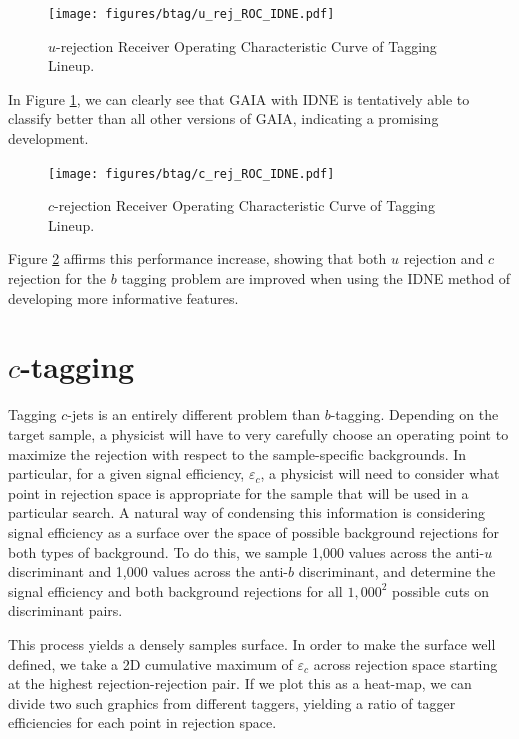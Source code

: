 \begin{figure}
\texttt{[image: figures/btag/u\_rej\_ROC\_IDNE.pdf]}
\caption[The ATLAS detector]{$u$-rejection Receiver Operating Characteristic Curve of Tagging Lineup.
\label{fig:urejROCIDNE}}
\end{figure}

In Figure \ref{fig:urejROCIDNE}, we can clearly see that GAIA with IDNE is tentatively able to classify better than all other versions of GAIA, indicating a promising development.  

\begin{figure}
\texttt{[image: figures/btag/c\_rej\_ROC\_IDNE.pdf]}
\caption[The ATLAS detector]{$c$-rejection Receiver Operating Characteristic Curve of Tagging Lineup.
\label{fig:crejROCIDNE}}
\end{figure}
Figure \ref{fig:crejROCIDNE} affirms this performance increase, showing that both $u$ rejection and $c$ rejection for the $b$ tagging problem are improved when using the IDNE method of developing more informative features. 

\section{$c$-tagging}

Tagging $c$-jets is an entirely different problem than $b$-tagging. Depending on the target sample, a physicist will have to very carefully choose an operating point to maximize the rejection with respect to the sample-specific backgrounds. In particular, for a given signal efficiency, $\varepsilon_c$, a physicist will need to consider what point in rejection space is appropriate for the sample that will be used in a particular search. A natural way of condensing this information is considering signal efficiency as a surface over the space of possible background rejections for both types of background. To do this, we sample 1,000 values across the anti-$u$ discriminant and 1,000 values across the anti-$b$ discriminant, and determine the signal efficiency and both background rejections for all $1,000^2$ possible cuts on discriminant pairs. 

This process yields a densely samples surface. In order to make the surface well defined, we take a 2D cumulative maximum of $\varepsilon_c$ across rejection space starting at the highest rejection-rejection pair. If we plot this as a heat-map, we can divide two such graphics from different taggers, yielding a ratio of tagger efficiencies for each point in rejection space. 

